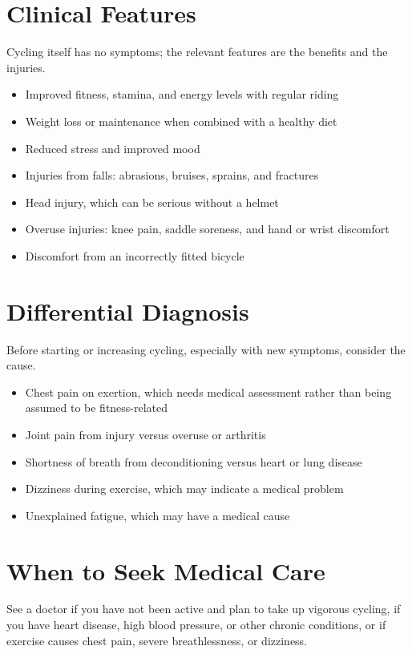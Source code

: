 \section*{Clinical Features}
Cycling itself has no symptoms; the relevant features are the benefits and the injuries.

\begin{itemize}
    \item Improved fitness, stamina, and energy levels with regular riding
    \item Weight loss or maintenance when combined with a healthy diet
    \item Reduced stress and improved mood
    \item Injuries from falls: abrasions, bruises, sprains, and fractures
    \item Head injury, which can be serious without a helmet
    \item Overuse injuries: knee pain, saddle soreness, and hand or wrist discomfort
    \item Discomfort from an incorrectly fitted bicycle
\end{itemize}

\section*{Differential Diagnosis}
Before starting or increasing cycling, especially with new symptoms, consider the cause.

\begin{itemize}
    \item Chest pain on exertion, which needs medical assessment rather than being assumed to be fitness-related
    \item Joint pain from injury versus overuse or arthritis
    \item Shortness of breath from deconditioning versus heart or lung disease
    \item Dizziness during exercise, which may indicate a medical problem
    \item Unexplained fatigue, which may have a medical cause
\end{itemize}

\section*{When to Seek Medical Care}
See a doctor if you have not been active and plan to take up vigorous cycling, if you have heart disease, high blood pressure, or other chronic conditions, or if exercise causes chest pain, severe breathlessness, or dizziness.

